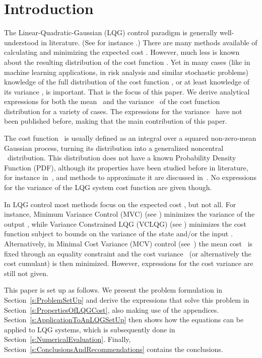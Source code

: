 \documentclass[twocolumn]{autart}
\begin{document}
\section{Introduction}

The Linear-Quadratic-Gaussian (LQG) control paradigm is generally well-understood in literature. (See for instance \cite{LQBook,MFCBook,DMCSBook,StochasticControlBook}.) There are many methods available of calculating and minimizing the expected cost . However, much less is known about the resulting distribution of the cost function . Yet in many cases (like in machine learning applications, in risk analysis and similar stochastic problems) knowledge of the full distribution of the cost function , or at least knowledge of its variance , is important. That is the focus of this paper. We derive analytical expressions for both the mean~ and the variance~ of the cost function distribution for a variety of cases. The expressions for the variance~ have not been published before, making that the main contribution of this paper.

The cost function~ is usually defined as an integral over a squared non-zero-mean Gaussian process, turning its distribution into a generalized noncentral ~distribution. This distribution does not have a known Probability Density Function (PDF), although its properties have been studied before in literature, for instance in~\cite{MathematicalAnalysisOfRandomNoise,DistributionOfTheTimeAveragePower,LQGCostPDFApproximation}, and methods to approximate it are discussed in~\cite{QFRVBook,ChiSquareDistribution}. No expressions for the variance of the LQG system cost function are given though.

In LQG control most methods focus on the expected cost , but not all. For instance, Minimum Variance Control (MVC) (see \cite{StochasticControlBook}) minimizes the variance of the output , while Variance Constrained LQG (VCLQG) (see \cite{FuzzyWeightsForVCLQG,LQGControllerWithVarianceConstraints}) minimizes the cost function subject to bounds on the variance of the state  and/or the input . Alternatively, in Minimal Cost Variance (MCV) control (see~\cite{ControlUsingCostCumulants,StatisticalControlBook}) the mean cost~ is fixed through an equality constraint and the cost variance~ (or alternatively the cost cumulant) is then minimized. However, expressions for the cost variance  are still not given.

This paper is set up as follows. We present the problem formulation in Section~\ref{s:ProblemSetUp} and derive the expressions that solve this problem in Section~\ref{s:PropertiesOfLQGCost}, also making use of the appendices. Section~\ref{s:ApplicationToAnLQGSetUp} then shows how the equations can be applied to LQG systems, which is subsequently done in Section~\ref{s:NumericalEvaluation}. Finally, Section~\ref{s:ConclusionsAndRecommendations} contains the conclusions.
\end{document}
